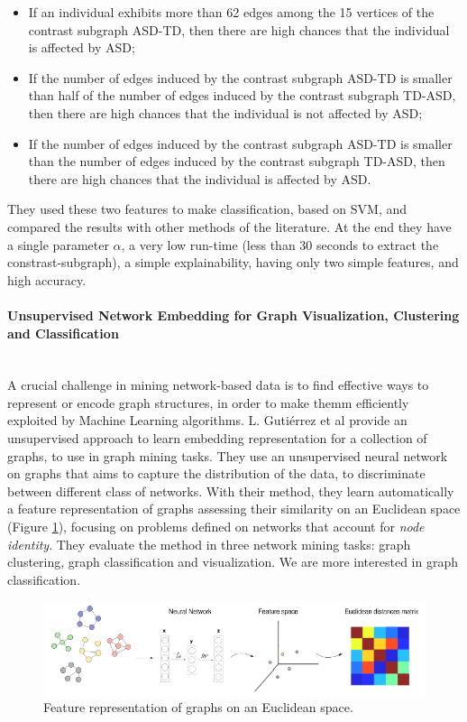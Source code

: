 \begin{itemize}
	\item If an individual exhibits more than 62 edges among the 15 vertices of the contrast subgraph ASD-TD, then there are high chances that the individual is affected by ASD;
	\item If the number of edges induced by the contrast subgraph ASD-TD is smaller than half of the number of edges induced by the contrast subgraph TD-ASD, then there are high chances that the individual is not affected by ASD;
	\item If the number of edges induced by the contrast subgraph ASD-TD is smaller than the number of edges induced by the contrast subgraph TD-ASD, then there are high chances that the individual is affected by ASD.
\end{itemize}

They used these two features to make classification, based on SVM, and compared the results with other methods of the literature. At the end they have a single parameter $\alpha$, a very low run-time (less than 30 seconds to extract the constrast-subgraph), a simple explainability, having only two simple features, and high accuracy. 

\paragraph{Unsupervised Network Embedding for Graph Visualization, Clustering and Classification}\
\label{par:2}
\\

A crucial challenge in mining network-based data is to find effective ways to represent or encode graph structures, in order to make themm efficiently exploited by Machine Learning algorithms. L. Gutiérrez et al \cite{GutierrezUn} provide an unsupervised approach to learn embedding representation for a collection of graphs, to use in graph mining tasks. They use an unsupervised neural network on graphs that aims to capture the distribution of the data, to discriminate between different class of networks. With their method, they learn automatically a feature representation of graphs assessing their similarity on an Euclidean space (Figure \ref{fig:diagram11}), focusing on problems defined on networks that account for \textit{node identity}. They evaluate the method in three network mining tasks: graph clustering, graph classification and visualization. We are more interested in graph classification.

\begin{figure}[htbp]
	\centering
	\includegraphics[scale=0.5]{Immagini/Unsupervised.PNG}
	\caption{Feature representation of graphs on an Euclidean space.}
	\label{fig:diagram11}
\end{figure}


